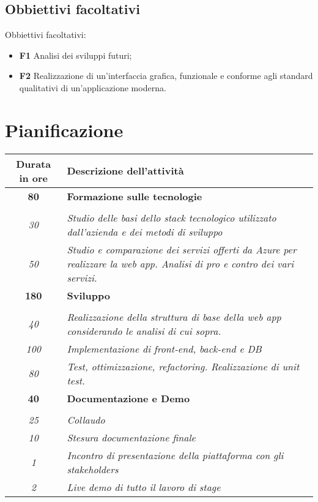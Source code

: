 \subsection{Obbiettivi facoltativi}
Obbiettivi facoltativi:
\begin{itemize}
    \item \textbf{F1} Analisi dei sviluppi futuri;
    \item \textbf{F2} Realizzazione di un'interfaccia grafica, funzionale e conforme agli standard qualitativi di un'applicazione moderna.

\end{itemize}
\section{Pianificazione}
\label{sec:pianificazione}
\begin{table}[!h]
    \label{tab:ripartizione-ore}
    \begin{tabularx}{\textwidth}{|c|X|}
        \hline
        \textbf{Durata in ore} & \textbf{Descrizione dell'attività} \\\hline
        
        \textbf{80} & \textbf{Formazione sulle tecnologie} \\ \hdashline
            \multirow{2}{0cm}\\
                \textit{30} &
                \textit{Studio delle basi dello stack tecnologico utilizzato dall'azienda e dei metodi di sviluppo} \\
                \textit{50} &
                \textit{Studio e comparazione dei servizi offerti da Azure per realizzare la web app. Analisi di pro e contro dei vari servizi.} \\
        \hline
        
        \textbf{180} & \textbf{Sviluppo} \\ \hdashline 
        \multirow{3}{0cm}\\ 
        \textit{40} & 
        \textit{Realizzazione della struttura di base della web app considerando le analisi di cui sopra.} \\
        \textit{100} & 
        \textit{Implementazione di front-end, back-end e DB} \\
        \textit{80} & 
        \textit{Test, ottimizzazione, refactoring. Realizzazione di unit test.} \\
        \hline
        
        \textbf{40} & \textbf{Documentazione e Demo}  \\ \hdashline 
        \multirow{4}{0cm}\\ 
        \textit{25} & 
        \textit{Collaudo} \\
        \textit{10} & 
        \textit{Stesura documentazione finale} \\
        \textit{1} & 
        \textit{Incontro di presentazione della piattaforma con gli stakeholders} \\
        \textit{2} & 
        \textit{Live demo di tutto il lavoro di stage} \\
        \hline
        

\end{tabularx}
\end{table}
